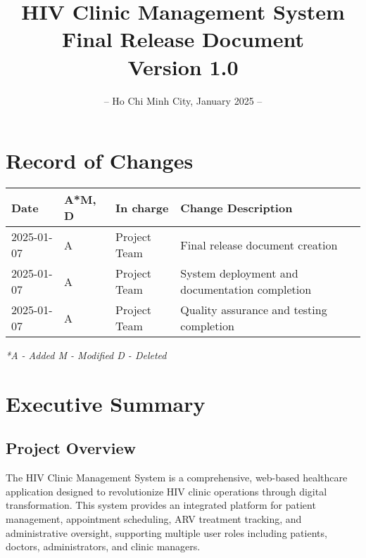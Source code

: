 \documentclass[12pt,a4paper]{article}
\title{
    \vspace{-2cm}
    \Huge\textbf{HIV Clinic Management System}\\
    \vspace{1cm}
    \Large\textbf{Final Release Document}\\
    \vspace{2cm}
    \normalsize Version 1.0
}
\author{}
\date{
    \vspace{4cm}
    – Ho Chi Minh City, January 2025 –
}
\begin{document}
\maketitle
\thispagestyle{empty}

\newpage

\section*{Record of Changes}
\begin{longtable}{|p{3cm}|p{2cm}|p{3cm}|p{6cm}|}
\hline
\textbf{Date} & \textbf{A*M, D} & \textbf{In charge} & \textbf{Change Description} \\
\hline
2025-01-07 & A & Project Team & Final release document creation \\
\hline
2025-01-07 & A & Project Team & System deployment and documentation completion \\
\hline
2025-01-07 & A & Project Team & Quality assurance and testing completion \\
\hline
\end{longtable}

\textit{*A - Added M - Modified D - Deleted}

\newpage

\tableofcontents

\newpage

\section{Executive Summary}

\subsection{Project Overview}
The HIV Clinic Management System is a comprehensive, web-based healthcare application designed to revolutionize HIV clinic operations through digital transformation. This system provides an integrated platform for patient management, appointment scheduling, ARV treatment tracking, and administrative oversight, supporting multiple user roles including patients, doctors, administrators, and clinic managers.
\end{document}

